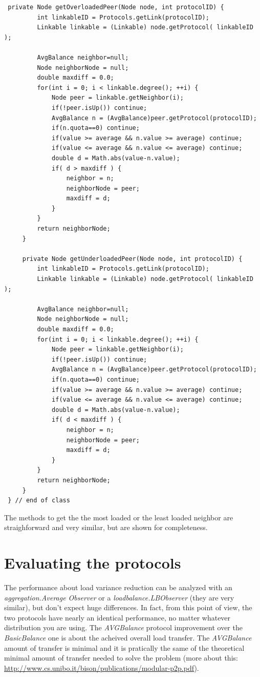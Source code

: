 \documentclass[a4paper,12pt]{article}
\begin{document}
\footnotesize
\begin{verbatim}
 private Node getOverloadedPeer(Node node, int protocolID) {
         int linkableID = Protocols.getLink(protocolID);
         Linkable linkable = (Linkable) node.getProtocol( linkableID );
     
         AvgBalance neighbor=null;
         Node neighborNode = null;
         double maxdiff = 0.0;
         for(int i = 0; i < linkable.degree(); ++i) {
             Node peer = linkable.getNeighbor(i); 
             if(!peer.isUp()) continue;
             AvgBalance n = (AvgBalance)peer.getProtocol(protocolID);
             if(n.quota==0) continue;
             if(value >= average && n.value >= average) continue;
             if(value <= average && n.value <= average) continue;
             double d = Math.abs(value-n.value); 
             if( d > maxdiff ) {
                 neighbor = n;
                 neighborNode = peer;
                 maxdiff = d;
             }
         }
         return neighborNode;
     } 
 
     private Node getUnderloadedPeer(Node node, int protocolID) {
         int linkableID = Protocols.getLink(protocolID);
         Linkable linkable = (Linkable) node.getProtocol( linkableID );
     
         AvgBalance neighbor=null;
         Node neighborNode = null;
         double maxdiff = 0.0;
         for(int i = 0; i < linkable.degree(); ++i) {
             Node peer = linkable.getNeighbor(i);
             if(!peer.isUp()) continue;
             AvgBalance n = (AvgBalance)peer.getProtocol(protocolID);
             if(n.quota==0) continue;
             if(value >= average && n.value >= average) continue;
             if(value <= average && n.value <= average) continue;
             double d = Math.abs(value-n.value); 
             if( d < maxdiff ) {
                 neighbor = n;
                 neighborNode = peer;
                 maxdiff = d;
             }
         }
         return neighborNode;
     } 
 } // end of class
\end{verbatim}
\normalsize


The methods to get the the most loaded or the least loaded neighbor
are straighforward and very similar, but are shown for completeness.


\section{Evaluating the protocols}

The performance about load variance reduction can be analyzed with
an \emph{aggregation.Average Observer} or a \emph{loadbalance.LBObserver}
(they are very similar), but don't expect huge differences. In fact,
from this point of view, the two protocols have nearly an identical
performance, no matter whatever distribution you are using. The 
\emph{AVGBalance}
protocol improvement over the \emph{BasicBalance} one is about the
acheived overall load transfer. The \emph{AVGBalance} amount of transfer
is minimal and it is pratically the same of the theoretical minimal
amount of transfer needed to solve the problem 
(more about this: \url{http://www.cs.unibo.it/bison/publications/modular-p2p.pdf}). 
\end{document}
